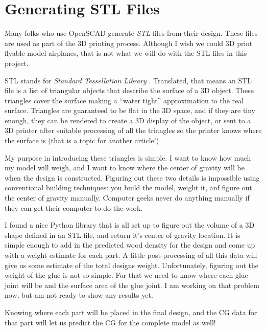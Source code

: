 \section*{Generating STL Files}

Many folks who use OpenSCAD generate {\it STL} files from their design. These
files are used as part of the 3D printing process. Although I wish we could 3D
print flyable model airplanes, that is not what we will do with the STL files
in this project.

STL stands for {\it Standard Tessellation Library} \citep{stlwiki}. Translated,
that means an STL file is a list of triangular objects that describe the
surface of a 3D object. These triangles cover the surface making a ``water
tight'' approximation to the real surface. Triangles are guaranteed to be flat
in the 3D space, and if they are tiny enough, they can be rendered to create a
3D display of the object, or sent to a 3D printer after suitable processing of all
the triangles so the printer knows where the surface is (that is a topic for
another article!)

My purpose in introducing these triangles is simple. I want to know how much my
model will weigh, and I want to know where the center of gravity will be when
the design is constructed. Figuring out these two details is impossible using
conventional building techniques: you build the model, weight it, anf figure
out the center of gravity manually. Computer geeks never do anything manually
if they can get their computer to do the work.

I found a nice Python library that is all set up to figure out the volume of a
3D shape defined in an STL file, and return it's center of gravity location. It
is simple enough to add in the predicted wood density for the design and come
up with a weight estimate for each part. A little post-processing of all this
data will give us some estimate of the total designs weight. Unfortunately,
figuring out the weight of the glue is not so simple. For that we need to know
where each glue joint will be and the surface area of the glue joint. I am
working on that problem now, but am not ready to show any results yet. 

Knowing where each part will be placed in the final design, and the CG data for
that part will let us predict the CG for the complete model as well! 
